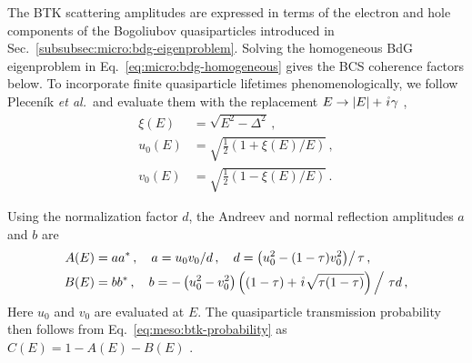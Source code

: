             The BTK scattering amplitudes are expressed in terms of the electron and hole components of the Bogoliubov quasiparticles introduced in Sec.~\ref{subsubsec:micro:bdg-eigenproblem}. Solving the homogeneous BdG eigenproblem in Eq.~\eqref{eq:micro:bdg-homogeneous} gives the BCS coherence factors below. To incorporate finite quasiparticle lifetimes phenomenologically, we follow Pleceník \textit{et al.}~and evaluate them with the replacement $E\rightarrow|E|+\ima\gamma$ \cite{plecenik_finite-quasiparticle-lifetime_1994},
            \begin{equation}
                \begin{aligned}
                    \xi(E) &= \sqrt{E^2-\Delta^2}\,,\\
                    u_0(E) &= \sqrt{\tfrac{1}{2}\left(1+\xi(E)/E\right)}\,,\\
                    v_0(E) &= \sqrt{\tfrac{1}{2}\left(1-\xi(E)/E\right)}\,.
                \end{aligned}
                \label{eq:meso:coherence-factors}
            \end{equation}

            Using the normalization factor $d$, the Andreev and normal reflection amplitudes $a$ and $b$ are
            \begin{equation}
                \begin{aligned}
                    A(E) &= aa^*\,,\quad
                    a= u_0v_0/d\,,\quad
                    d = \left(u^2_0-(1-\tau)v_0^2\middle)\right/\tau\,,\\
                    B(E) &= bb^*\,,\quad
                    b= -\left(u_0^2-v_0^2\right)\left( (1-\tau) + \ima \sqrt{\tau(1-\tau)} \middle)\,\right/\,\tau d\,,
                \end{aligned}
                \label{eq:meso:btk-amplitudes}
            \end{equation}
            Here $u_0$ and $v_0$ are evaluated at $E$. The quasiparticle transmission probability then follows from Eq.~\eqref{eq:meso:btk-probability} as $C(E)=1-A(E)-B(E)$ \cite{blonder_transition_1982,plecenik_finite-quasiparticle-lifetime_1994}.

